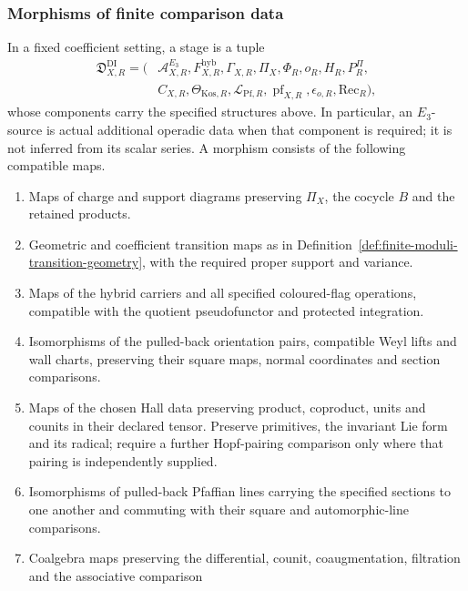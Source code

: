 \subsubsection*{Morphisms of finite comparison data}

\begin{definition}
\label{def:finite-stage-dirac-igusa-morphism}
In a fixed coefficient setting, a stage is a tuple
\[
 \begin{split}
 \mathfrak D^{\mathrm{DI}}_{X,R}=
 (&\mathcal A_{X,R}^{E_3},F_{X,R}^{\mathrm{hyb}},
   \Gamma_{X,R},\Pi_X,\Phi_R,o_R,H_R,P_R^\Pi,\\
  &C_{X,R},\Theta_{\mathrm{Kos},R},
   \mathscr L_{\mathrm{Pf},R},\operatorname{pf}_{X,R},
   \epsilon_{o,R},\mathrm{Rec}_R),
 \end{split}
\]
whose components carry the specified structures above. In particular,
an \(E_3\)-source is actual additional operadic data when that
component is required; it is not inferred from its scalar series.
A morphism consists of the following compatible maps.
\begin{enumerate}
\item[(M1)] Maps of charge and support diagrams preserving
  \(\Pi_X\), the cocycle \(B\) and the retained products.
\item[(M2)] Geometric and coefficient transition maps as in
  Definition~\ref{def:finite-moduli-transition-geometry}, with the
  required proper support and variance.
\item[(M3)] Maps of the hybrid carriers and all specified
  coloured-flag operations, compatible with the quotient
  pseudofunctor and protected integration.
\item[(M4)] Isomorphisms of the pulled-back orientation pairs,
  compatible Weyl lifts and wall charts, preserving their square
  maps, normal coordinates and section comparisons.
\item[(M5)] Maps of the chosen Hall data preserving product,
  coproduct, units and counits in their declared tensor. Preserve
  primitives, the invariant Lie form and its radical; require a
  further Hopf-pairing comparison only where that pairing is
  independently supplied.
\item[(M6)] Isomorphisms of pulled-back Pfaffian lines carrying
  the specified sections to one another and commuting with their
  square and automorphic-line comparisons.
\item[(M7)] Coalgebra maps preserving the differential, counit,
  coaugmentation, filtration and the associative comparison

\end{enumerate}
\end{definition}
